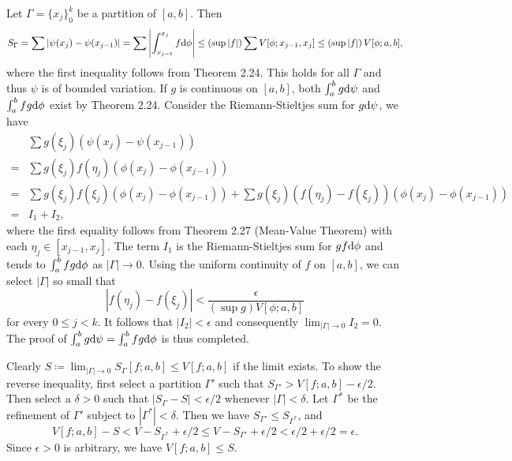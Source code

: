 \begin{exercise}{2.15}
  Let $\Gamma = \{x_j\}_0^k$ be a partition of $[a,b]$. Then
  \[
    S_\Gamma = \sum \left\vert \psi(x_j) - \psi(x_{j-1}) \right\vert
    = \sum \left\vert \int_{x_{j-1}}^{x_j} f \mathrm{d} \phi \right\vert
    \le \left(\sup |f|\right) \sum V[\phi; x_{j-1}, x_j]
    \le \left(\sup |f|\right) V[\phi; a,b],
  \]
  where the first inequality follows from Theorem 2.24.
  This holds for all $\Gamma$ and thus $\psi$ is of bounded variation.
  If $g$ is continuous on $[a,b]$,
  both $\int_a^b g \mathrm{d} \psi$ and $\int_a^b fg \mathrm{d} \phi$ exist
  by Theorem 2.24.
  Consider the Riemann-Stieltjes sum for $g \mathrm{d} \psi$, we have
  \begin{align*}
    & \sum g(\xi_j) \left( \psi(x_j) - \psi(x_{j-1}) \right) \\
    = & \sum g(\xi_j) f(\eta_j) \left( \phi(x_j) - \phi(x_{j-1}) \right) \\
    = & \sum g(\xi_j) f(\xi_j) \left( \phi(x_j) - \phi(x_{j-1}) \right)
    + \sum g(\xi_j) \left( f(\eta_j) - f(\xi_j) \right)
    \left( \phi(x_j) - \phi(x_{j-1}) \right) \\
    = & I_1 + I_2,
  \end{align*}
  where the first equality follows from Theorem 2.27 (Mean-Value Theorem)
  with each $\eta_j \in [x_{j-1}, x_j]$.
  The term $I_1$ is the Riemann-Stieltjes sum for $gf \mathrm{d} \phi$
  and tends to $\int_a^b fg \mathrm{d} \phi$ as $|\Gamma| \rightarrow 0$.
  Using the uniform continuity of $f$ on $[a,b]$,
  we can select $|\Gamma|$ so small that
  \[
    \left\vert f(\eta_j) - f(\xi_j) \right\vert <
    \frac{\epsilon} {\left( \sup g \right) V[\phi; a,b]}
  \]
  for every $0 \le j < k$.
  It follows that $|I_2| < \epsilon$
  and consequently $\lim_{|\Gamma| \rightarrow 0} I_2 = 0$.
  The proof of $\int_a^b g \mathrm{d} \psi = \int_a^b fg \mathrm{d} \phi$ is thus completed.
\end{exercise}

\begin{exercise}{2.20}
  Clearly $S \coloneqq \lim_{|\Gamma| \rightarrow 0} S_\Gamma[f;a,b] \le V[f;a,b]$
  if the limit exists.
  To show the reverse inequality,
  first select a partition $\Gamma'$ such that
  $S_{\Gamma'} > V[f;a,b] - \epsilon/2$.
  Then select a $\delta > 0$ such that
  $|S_\Gamma - S| < \epsilon/2$ whenever $|\Gamma| < \delta$.
  Let $\Gamma^\ast$ be the refinement of $\Gamma'$
  subject to $|\Gamma^\ast| < \delta$.
  Then we have $S_{\Gamma'} \le S_{\Gamma^\ast}$, and
  \[
    V[f;a,b] - S < V - S_{\Gamma^\ast} + \epsilon/2
    \le V - S_{\Gamma'} + \epsilon/2
    < \epsilon/2 + \epsilon/2 = \epsilon.
  \]
  Since $\epsilon > 0$ is arbitrary,
  we have $V[f;a,b] \le S$.
\end{exercise}
